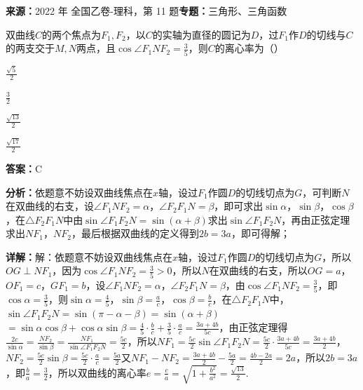 \begin{question}[points=5]
\textbf{来源：}2022 年 全国乙卷-理科，第 11 题\quad \textbf{专题：}三角形、三角函数\par
双曲线$C$的两个焦点为$F_1, F_2$，以$C$的实轴为直径的圆记为$D$，过$F_1$作$D$的切线与$C$的两支交于$M, N$两点，且$\cos\angle F_1NF_2 = \frac{3}{5}$，则$C$的离心率为（\qquad）
\begin{choices}
  \item $\frac{\sqrt{5}}{2}$
  \item $\frac{3}{2}$
  \item $\frac{\sqrt{13}}{2}$
  \item $\frac{\sqrt{17}}{2}$
\end{choices}
\begin{solution}
\textbf{答案：}C

\textbf{分析：}依题意不妨设双曲线焦点在$x$轴，设过$F_1$作圆$D$的切线切点为$G$，可判断$N$在双曲线的右支，设$\angle F_1NF_2 = \alpha$，$\angle F_2F_1N = \beta$，即可求出$\sin\alpha$，$\sin\beta$，$\cos\beta$，在$\triangle F_2F_1N$中由$\sin\angle F_1F_2N = \sin(\alpha+\beta)$求出$\sin\angle F_1F_2N$，再由正弦定理求出$NF_1$，$NF_2$，最后根据双曲线的定义得到$2b=3a$，即可得解；

\textbf{详解：}解：依题意不妨设双曲线焦点在$x$轴，设过$F_1$作圆$D$的切线切点为$G$，所以$OG \perp NF_1$，因为$\cos\angle F_1NF_2 = \frac{3}{5} > 0$，所以$N$在双曲线的右支，所以$OG = a$，$OF_1 = c$，$GF_1 = b$，设$\angle F_1NF_2 = \alpha$，$\angle F_2F_1N = \beta$，由$\cos\angle F_1NF_2 = \frac{3}{5}$，即$\cos\alpha = \frac{3}{5}$，则$\sin\alpha = \frac{4}{5}$，$\sin\beta = \frac{a}{c}$，$\cos\beta = \frac{b}{c}$，在$\triangle F_2F_1N$中，$\sin\angle F_1F_2N = \sin(\pi-\alpha-\beta) = \sin(\alpha+\beta)$\\$= \sin\alpha\cos\beta + \cos\alpha\sin\beta = \frac{4}{5}\cdot\frac{b}{c} + \frac{3}{5}\cdot\frac{a}{c} = \frac{3a+4b}{5c}$，由正弦定理得$\frac{2c}{\sin\alpha} = \frac{NF_2}{\sin\beta} = \frac{NF_1}{\sin\angle F_1F_2N} = \frac{5c}{2}$，所以$NF_1 = \frac{5c}{2}\sin\angle F_1F_2N = \frac{5c}{2}\cdot\frac{3a+4b}{5c} = \frac{3a+4b}{2}$，$NF_2 = \frac{5c}{2}\sin\beta = \frac{5c}{2}\cdot\frac{a}{c} = \frac{5a}{2}$又$NF_1 - NF_2 = \frac{3a+4b}{2} - \frac{5a}{2} = \frac{4b-2a}{2} = 2a$，所以$2b = 3a$，即$\frac{b}{a} = \frac{3}{2}$，所以双曲线的离心率$e = \frac{c}{a} = \sqrt{1+\frac{b^2}{a^2}} = \frac{\sqrt{13}}{2}$.
\end{solution}
\end{question}

